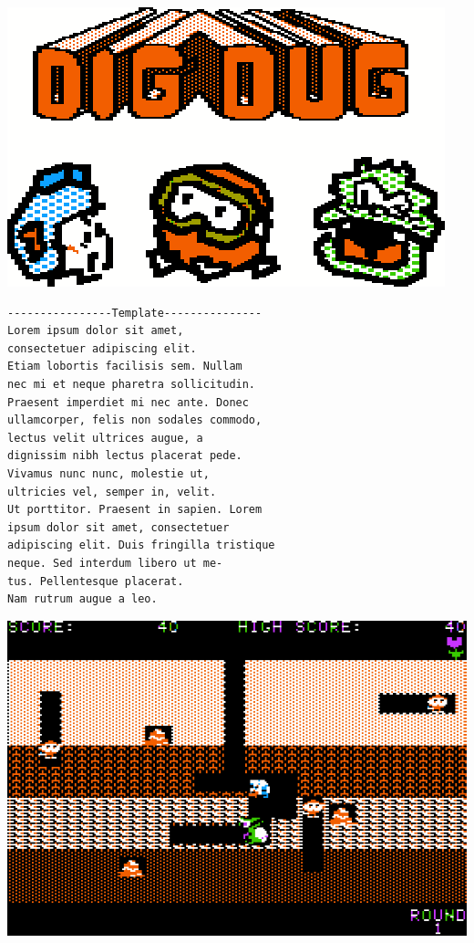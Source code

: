 \documentclass{article}
\begin{document}
\newpage
{}

\vspace*{-\baselineskip}

\tableofcontents

\vspace*{\fill}

\centerline{\includegraphics[width=.9\textwidth]{title}}

\vspace*{\fill}

\newpage


\begin{verbatim}
----------------Template---------------
Lorem ipsum dolor sit amet,
consectetuer adipiscing elit.
Etiam lobortis facilisis sem. Nullam
nec mi et neque pharetra sollicitudin.
Praesent imperdiet mi nec ante. Donec
ullamcorper, felis non sodales commodo,
lectus velit ultrices augue, a
dignissim nibh lectus placerat pede.
Vivamus nunc nunc, molestie ut,
ultricies vel, semper in, velit.
Ut porttitor. Praesent in sapien. Lorem
ipsum dolor sit amet, consectetuer
adipiscing elit. Duis fringilla tristique
neque. Sed interdum libero ut me-
tus. Pellentesque placerat.
Nam rutrum augue a leo.
\end{verbatim}

\vspace*{2\baselineskip}

\centerline{\includegraphics[width=.9\textwidth]{level1}}
\end{document}
